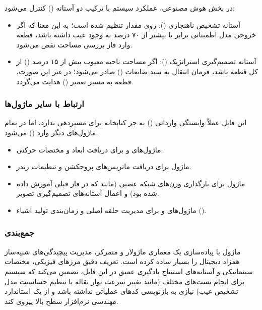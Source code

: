 \documentclass{article}
\begin{document}
در بخش هوش مصنوعی، عملکرد سیستم با ترکیب دو آستانه () کنترل می‌شود:

\begin{itemize}
	\item آستانه تشخیص ناهنجاری (): روی مقدار  تنظیم شده است؛ به این معنا که اگر خروجی مدل  اطمینانی برابر یا بیشتر از ۷۰ درصد به وجود عیب داشته باشد، قطعه وارد فاز بررسی مساحت نقص می‌شود.
	
	\item آستانه تصمیم‌گیری استراتژیک (): اگر مساحت ناحیه معیوب بیش از ۱۵ درصد () از کل قطعه باشد، فرمان انتقال به سبد ضایعات () صادر می‌شود؛ در غیر این صورت، قطعه به مسیر تعمیر () هدایت می‌گردد.
\end{itemize}

\subsubsection{ارتباط با سایر ماژول‌ها}
این فایل عملاً وابستگی وارداتی () به جز کتابخانه  برای مسیردهی ندارد، اما در تمام ماژول‌های دیگر وارد () می‌شود.

\begin{itemize}
	\item ماژول‌های  و  برای دریافت ابعاد و مختصات حرکتی.
	\item ماژول  برای دریافت ماتریس‌های پروجکشن و تنظیمات رندر.
	\item ماژول  برای بارگذاری وزن‌های شبکه عصبی (مانند  که در فاز قبلی آموزش داده شده بود) و اعمال آستانه‌های تصمیم‌گیری تصویر.
	\item ماژول‌های  و  برای مدیریت حلقه اصلی و زمان‌بندی تولید اشیاء ().
\end{itemize}

\subsubsection{جمع‌بندی}
ماژول  با پیاده‌سازی یک معماری ماژولار و متمرکز، مدیریت پیچیدگی‌های شبیه‌ساز همزاد دیجیتال را بسیار ساده کرده است. تعریف دقیق مرزهای فیزیکی، مختصات سینماتیکی و آستانه‌های استنتاج یادگیری عمیق در این فایل، تضمین می‌کند که سیستم برای انجام تست‌های مختلف (مانند تغییر سرعت نوار نقاله یا تنظیم حساسیت مدل تشخیص عیب) نیازی به بازنویسی کدهای عملیاتی نداشته باشد و از یک استاندارد مهندسی نرم‌افزار سطح بالا پیروی کند.
\end{document}
